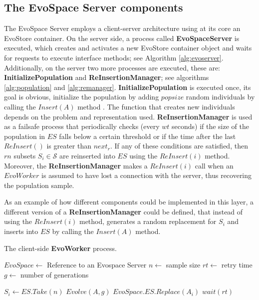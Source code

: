 \subsection{The EvoSpace Server components}
The EvoSpace Server employs a client-server architecture using at its core an EvoStore container. On the server side, a process called \textbf{EvoSpaceServer} is executed, which creates and activates a new EvoStore container object and waits for requests to execute interface methods; see Algorithm \ref{alg:evoserver}. Additionally, on the server two more processes are executed, these are: \textbf{InitializePopulation} and \textbf{ReInsertionManager};
see algorithms \ref{alg:population} and \ref{alg:remanager}.
\textbf{InitializePopulation} is executed once, its goal is obvious, initialize the population by adding $popsize$ random
individuals by calling the $Insert(A)$ method . The function that creates new individuals depends on the problem and representation used.
\textbf{ReInsertionManager} is used as a failsafe process that periodically checks (every $wt$ seconds) if the size of the population in $ES$
falls below a certain threshold or if the time after the last $ReInsert()$ is greater than $next_r$.
If any of these conditions are satisfied, then $rn$ subsets $S_i \in \mathcal{S}$ are reinserted into $ES$ using the $ReInsert(i)$ method.
Moreover, the \textbf{ReInsertionManager} makes a $ReInsert(i)$ call when an $EvoWorker$ is assumed to have lost a connection with the server,
thus recovering the population sample.

As an example of how different components could be implemented in this layer, 
a different version of a \textbf{ReInsertionManager} could be defined, that instead of using the $ReInsert(i)$ method, generates a random replacement for $S_i$ and inserts into $ES$ by calling the $Insert(A)$ method.

\begin{algorithm}[t]
\caption{The client-side \textbf{EvoWorker} process.}
\begin{algorithmic}
\REQUIRE $EvoSpace \leftarrow$ Reference to an Evospace Server
\REQUIRE $n \leftarrow$ sample size
\REQUIRE $rt \leftarrow$ retry time
\REQUIRE $g \leftarrow$ number of generations

\STATE $S_i \leftarrow ES.Take(n)$
\STATE $Evolve(A,g)$
\STATE $EvoSpace.ES.Replace(A_i)$
\ELSE
\STATE $wait(rt)$
\ENDIF
\ENDWHILE
\end{algorithmic}
\label{alg:worker}
\end{algorithm}

